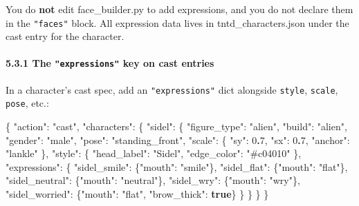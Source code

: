 \documentclass[
  12pt,
  letterpaper,
]{book}
\newenvironment{Shaded}{}{}
\newcommand{\DataTypeTok}[1]{\textcolor[rgb]{0.56,0.13,0.00}{#1}}
\newcommand{\DecValTok}[1]{\textcolor[rgb]{0.25,0.63,0.44}{#1}}
\newcommand{\ErrorTok}[1]{\textcolor[rgb]{1.00,0.00,0.00}{\textbf{#1}}}
\newcommand{\FunctionTok}[1]{\textcolor[rgb]{0.02,0.16,0.49}{#1}}
\newcommand{\KeywordTok}[1]{\textcolor[rgb]{0.00,0.44,0.13}{\textbf{#1}}}
\newcommand{\StringTok}[1]{\textcolor[rgb]{0.25,0.44,0.63}{#1}}
\begin{document}
You do \textbf{not} edit face\_builder.py to add expressions, and you do
not declare them in the \texttt{"faces"} block. All expression data
lives in tntd\_characters.json under the cast entry for the character.

\paragraph{\texorpdfstring{5.3.1 The \texttt{"expressions"} key on cast
entries}{5.3.1 The "expressions" key on cast entries}}\label{the-expressions-key-on-cast-entries}

In a character's cast spec, add an \texttt{"expressions"} dict alongside
\texttt{style}, \texttt{scale}, \texttt{pose}, etc.:

\begin{Shaded}
\begin{Highlighting}[]
\FunctionTok{\{}
  \DataTypeTok{"action"}\FunctionTok{:} \StringTok{"cast"}\FunctionTok{,}
  \DataTypeTok{"characters"}\FunctionTok{:} \FunctionTok{\{}
    \DataTypeTok{"sidel"}\FunctionTok{:} \FunctionTok{\{}
      \DataTypeTok{"figure\_type"}\FunctionTok{:} \StringTok{"alien"}\FunctionTok{,}
      \DataTypeTok{"build"}\FunctionTok{:}       \StringTok{"alien"}\FunctionTok{,}
      \DataTypeTok{"gender"}\FunctionTok{:}      \StringTok{"male"}\FunctionTok{,}
      \DataTypeTok{"pose"}\FunctionTok{:}        \StringTok{"standing\_front"}\FunctionTok{,}
      \DataTypeTok{"scale"}\FunctionTok{:}       \FunctionTok{\{} \DataTypeTok{"sy"}\FunctionTok{:} \DecValTok{0}\ErrorTok{.}\DecValTok{7}\FunctionTok{,} \DataTypeTok{"sx"}\FunctionTok{:} \DecValTok{0}\ErrorTok{.}\DecValTok{7}\FunctionTok{,} \DataTypeTok{"anchor"}\FunctionTok{:} \StringTok{"lankle"} \FunctionTok{\},}
      \DataTypeTok{"style"}\FunctionTok{:}       \FunctionTok{\{} \DataTypeTok{"head\_label"}\FunctionTok{:} \StringTok{"Sidel"}\FunctionTok{,} \DataTypeTok{"edge\_color"}\FunctionTok{:} \StringTok{"\#c04010"} \FunctionTok{\},}
      \DataTypeTok{"expressions"}\FunctionTok{:} \FunctionTok{\{}
        \DataTypeTok{"sidel\_smile"}\FunctionTok{:}   \FunctionTok{\{}\DataTypeTok{"mouth"}\FunctionTok{:} \StringTok{"smile"}\FunctionTok{\},}
        \DataTypeTok{"sidel\_flat"}\FunctionTok{:}    \FunctionTok{\{}\DataTypeTok{"mouth"}\FunctionTok{:} \StringTok{"flat"}\FunctionTok{\},}
        \DataTypeTok{"sidel\_neutral"}\FunctionTok{:} \FunctionTok{\{}\DataTypeTok{"mouth"}\FunctionTok{:} \StringTok{"neutral"}\FunctionTok{\},}
        \DataTypeTok{"sidel\_wry"}\FunctionTok{:}     \FunctionTok{\{}\DataTypeTok{"mouth"}\FunctionTok{:} \StringTok{"wry"}\FunctionTok{\},}
        \DataTypeTok{"sidel\_worried"}\FunctionTok{:} \FunctionTok{\{}\DataTypeTok{"mouth"}\FunctionTok{:} \StringTok{"flat"}\FunctionTok{,} \DataTypeTok{"brow\_thick"}\FunctionTok{:} \KeywordTok{true}\FunctionTok{\}}
      \FunctionTok{\}}
    \FunctionTok{\}}
  \FunctionTok{\}}
\FunctionTok{\}}
\end{Highlighting}
\end{Shaded}
\end{document}
